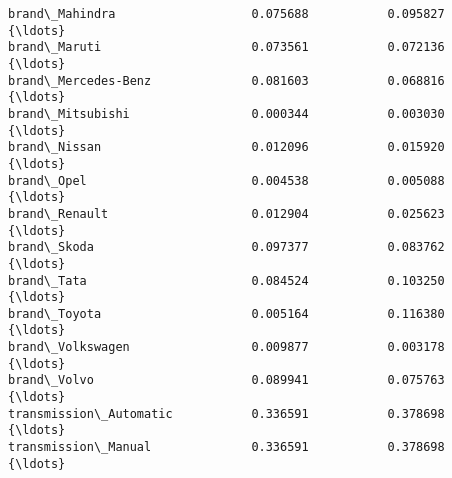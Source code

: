 \documentclass[11pt]{article}
\begin{document}
\begin{tcolorbox}[breakable, size=fbox, boxrule=.5pt, pad at break*=1mm, opacityfill=0]
\begin{Verbatim}[commandchars=\\\{\}]
brand\_Mahindra                   0.075688           0.095827  {\ldots}
brand\_Maruti                     0.073561           0.072136  {\ldots}
brand\_Mercedes-Benz              0.081603           0.068816  {\ldots}
brand\_Mitsubishi                 0.000344           0.003030  {\ldots}
brand\_Nissan                     0.012096           0.015920  {\ldots}
brand\_Opel                       0.004538           0.005088  {\ldots}
brand\_Renault                    0.012904           0.025623  {\ldots}
brand\_Skoda                      0.097377           0.083762  {\ldots}
brand\_Tata                       0.084524           0.103250  {\ldots}
brand\_Toyota                     0.005164           0.116380  {\ldots}
brand\_Volkswagen                 0.009877           0.003178  {\ldots}
brand\_Volvo                      0.089941           0.075763  {\ldots}
transmission\_Automatic           0.336591           0.378698  {\ldots}
transmission\_Manual              0.336591           0.378698  {\ldots}


\end{Verbatim}
\end{tcolorbox}
\end{document}
